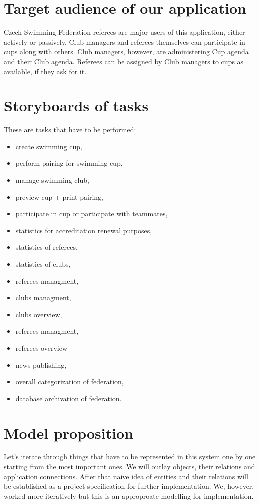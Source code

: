 \section{Target audience of our application}
Czech Swimming Federation referees are major users of this application, either actively or passively. Club managers and referees themselves can participate in cups along with others. Club managers, however, are administering Cup agenda and their Club agenda. Referees can be assigned by Club managers to cups as available, if they ask for it.
\section{Storyboards of tasks}
These are tasks that have to be performed:
\begin{itemize}
    \item create swimming cup,
    \item perform pairing for swimming cup,
    \item manage swimming club,
    \item preview cup + print pairing,
    \item participate in cup or participate with teammates,
    \item statistics for accreditation renewal purposes,
    \item statistics of referees,
    \item statistics of clubs,
    \item referees managment,
    \item clubs managment,
    \item clubs overview,
    \item referees managment,
    \item referees overview
    \item news publishing,
    \item overall categorization of federation,
    \item database archivation of federation.
  \end{itemize}
\section{Model proposition}
Let's iterate through things that have to be represented in this system one by one starting from the most important ones. We will outlay  objects, their relations and application connections. After that naive idea of entities and their relations will be established as a project specification for further implementation. We, however, worked more iteratively but this is an approproate modelling for implementation. 
\par
